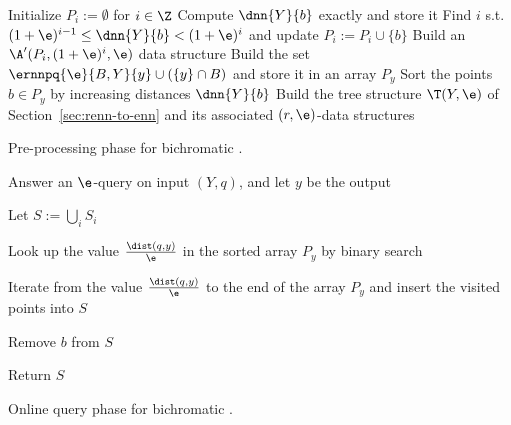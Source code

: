\begin{comment}
What makes bichromatic \rnn search generally more difficult than
the monochromatic version is that arbitrarily many blue points may lie
close to the query point $q$, whereas in the monochromatic setting
only a limited number of data points can lie close to $q$, even though
this limit is exponential in the ambient dimension~\cite{PZ04}. This
means that the output set in the bichromatic setting can be
arbitrarily larger, which makes it even more important to work out
output-sensitive running time bounds.
\end{comment}


\begin{algorithm}[!htb]
\LinesNumbered


  \BlankLine

  Initialize $P_i := \emptyset$ for $i\in \Z$\;
   {
    Compute $\dnn{Y}{b}$ exactly and store it\;
    Find $i$ s.t. $(1+\e)^{i-1}\leq \dnn{Y}{b}<(1+\e)^{i}$ and
    update $P_i := P_i \cup \{b\}$\;
  }
   {
    Build an $\A'(P_i, (1+\e)^{i}, \e)$ data structure\;
  }
   {
    Build the set $\ernnpq{\e}{B,Y}{y}\cup(\{y\}\cap B)$ and store it 
    in an array $P_y$ \;
    Sort the points $b\in P_y$ by increasing distances $\dnn{Y}{b}$\;
  }
  Build the tree structure $\T(Y,\e)$ of
  Section~\ref{sec:renn-to-enn} and its associated $(r,\e)$-\pleb data
  structures  \;
\caption{\small Pre-processing phase for bichromatic \rnn.}
  \label{alg:rnnpre_bichro}
\end{algorithm}
\begin{algorithm}[!htb]
\LinesNumbered


  \BlankLine

Answer an $\e$-\nn query on input $(Y,q)$, and let  $y$ be the output \;
   { 
  }

  Let $S:=\bigcup_i S_i$\; 

  Look up the value $\frac{\dist(q,y)}{\e}$ in the sorted array $P_y$ by binary search \;

  Iterate from the value $\frac{\dist(q,y)}{\e}$ to the end of the array $P_y$ and insert the visited points into $S$ \;


   {
     {
        Remove $b$ from $S$\;
    }
  } 

  Return $S$ \;
\caption{\small Online query phase for bichromatic \rnn.}
  \label{alg:rnnquery_bichro}
\end{algorithm}


